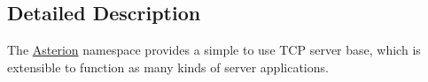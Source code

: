 \subsection{Detailed Description}
The \hyperlink{namespaceAsterion}{Asterion} namespace provides a simple to use T\-C\-P server base, which is extensible to function as many kinds of server applications. 